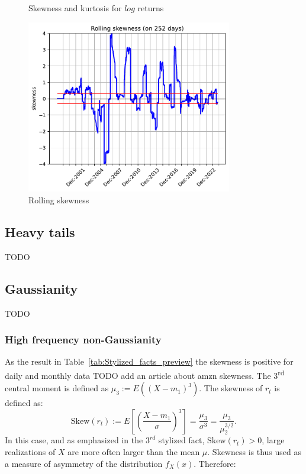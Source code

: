 \documentclass{article}
\begin{document}
\begin{figure}[H]
    \centering
    \begin{minipage}{0.45\textwidth}
        \begin{table}[H]
            \centering
              
            \caption{Skewness and kurtosis for $log$ returns}
            \label{tab:skewness_kurtosis}
        \end{table}
    \end{minipage}
    \hspace{0.05\textwidth}
    \begin{minipage}{0.45\textwidth}
        \centering
        \includegraphics[width=0.8\textwidth]{Img/Fact3_2_rollskew.pdf}
        \caption{Rolling skewness}
        \label{fig:Rolling_skewness}
    \end{minipage}
\end{figure}


\subsection{Heavy tails}
TODO
\subsection{Gaussianity}
TODO
\subsubsection{High frequency non-Gaussianity}

\noindent As the result in Table~\ref{tab:Stylized_facts_preview} 
the skewness is positive for daily and monthly data \cite{Skewness} TODO add an article about amzn skewness.
The 3\textsuperscript{rd} central moment is defined as
$\mu_3 := E((X - m_1)^3).$ The skewness of \( r_t \) is defined as:
\[
\text{Skew}(r_t) := E \left[ \left( \frac{X - m_1}{\sigma} \right)^3 \right] = \frac{\mu_3}{\sigma^3} = \frac{\mu_3}{\mu_2^{3/2}}.
\]
In this case, and as emphasized in the $3^{rd}$ stylized fact, \( \text{Skew}(r_t) >0 \), large realizations of \( X \) are more often larger
than the mean \( \mu \). 
Skewness is thus used as a measure of asymmetry of the distribution \( f_X(x) \). Therefore:
 
\end{document}
